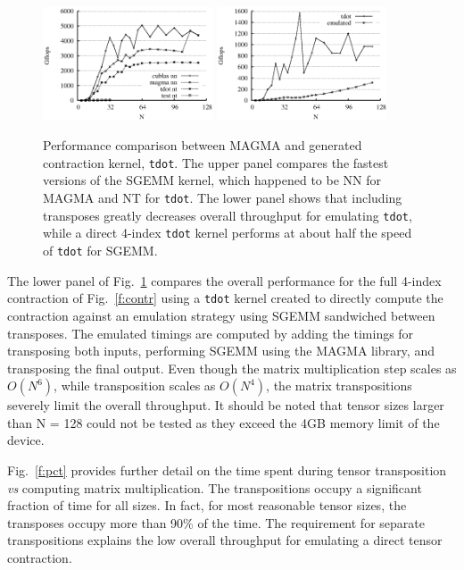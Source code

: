 \documentclass[preprint]{sigplanconf}
\begin{document}
\begin{figure}
{ \centering
\includegraphics[width=0.45\textwidth]{sgemm.eps}
\includegraphics[width=0.45\textwidth]{gflops.eps} }
\caption{Performance comparison between MAGMA and generated contraction
kernel, {\tt tdot}.  The upper panel compares the fastest versions of the SGEMM kernel,
which happened to be NN for MAGMA and NT for {\tt tdot}.  The lower panel
shows that including transposes greatly decreases overall throughput for emulating {\tt tdot},
while a direct 4-index {\tt tdot} kernel performs at about half the speed of {\tt tdot} for SGEMM.}\label{f:gflops}
\end{figure}

  The lower panel of Fig.~\ref{f:gflops} compares the overall performance for the full
4-index contraction of Fig.~\ref{f:contr} using a {\tt tdot} kernel created
to directly compute the contraction against an emulation strategy using
SGEMM sandwiched between transposes.  The emulated timings are computed
by adding the timings for transposing both inputs, performing SGEMM using the MAGMA library,
and transposing the final output.  Even though the matrix multiplication
step scales as $O(N^6)$, while transposition scales as $O(N^4)$,
the matrix transpositions severely limit the overall throughput.  It should be noted
that tensor sizes larger than N = 128 could not be tested as they exceed the 4GB memory
limit of the device.

  Fig.~\ref{f:pct} provides further detail on the time spent during tensor transposition
{\em vs} computing matrix multiplication.  The transpositions occupy a significant
fraction of time for all sizes.  In fact, for most reasonable tensor sizes, the transposes
occupy more than 90\% of the time.  The requirement for separate transpositions
explains the low overall throughput for emulating a direct tensor contraction.
\end{document}
